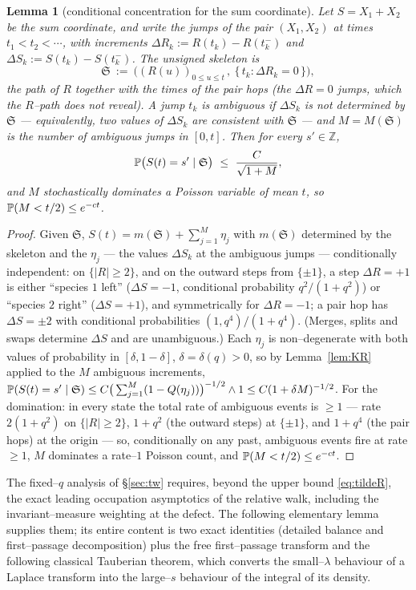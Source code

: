 \documentclass[11pt]{article}
\theoremstyle{plain}
\newtheorem{lemma}[theorem]{Lemma}
\theoremstyle{definition}
\theoremstyle{remark}
\newcommand{\Z}{\mathbb{Z}}\newcommand{\R}{\mathbb{R}}\newcommand{\N}{\mathbb{N}}
\begin{document}
\begin{lemma}[conditional concentration for the sum coordinate]\label{lem:Slclt}
Let $S=X_1+X_2$ be the sum coordinate, and write the jumps of the pair $(X_1,X_2)$ at
times $t_1<t_2<\cdots$, with increments $\Delta R_k:=R(t_k)-R(t_k^-)$ and
$\Delta S_k:=S(t_k)-S(t_k^-)$. The \emph{unsigned skeleton} is
\begin{equation}\label{eq:skeleton}
  \mathfrak S\ :=\ \Big((R(u))_{0\le u\le t}\,,\ \{\,t_k:\Delta R_k=0\,\}\Big),
\end{equation}
the path of $R$ together with the times of the pair hops (the $\Delta R=0$ jumps, which
the $R$--path does not reveal). A jump $t_k$ is \emph{ambiguous} if $\Delta S_k$ is not
determined by $\mathfrak S$ --- equivalently, two values of $\Delta S_k$ are consistent
with $\mathfrak S$ --- and $M=M(\mathfrak S)$ is the number of ambiguous jumps in
$[0,t]$. Then for every $s'\in\Z$,
\[
  \PP\big(S(t)=s'\mid \mathfrak S\big)\ \le\ \frac{C}{\sqrt{1+M}},
\]
and $M$ stochastically dominates a Poisson variable of mean $t$, so
$\mathbb{P}(M<t/2)\le e^{-ct}$.
\end{lemma}
\begin{proof}
Given $\mathfrak S$, $S(t)=m(\mathfrak S)+\sum_{j=1}^M\eta_j$ with $m(\mathfrak S)$
determined by the skeleton and the $\eta_j$ --- the values $\Delta S_k$ at the
ambiguous jumps --- conditionally independent: on
$\{|R|\ge2\}$, and on the outward steps from $\{\pm1\}$, a step $\Delta R=+1$ is
either ``species $1$ left'' ($\Delta S=-1$, conditional probability $q^2/(1+q^2)$) or
``species $2$ right'' ($\Delta S=+1$), and symmetrically for $\Delta R=-1$; a pair
hop has $\Delta S=\pm2$ with conditional probabilities $(1,q^4)/(1+q^4)$. (Merges,
splits and swaps determine $\Delta S$ and are unambiguous.) Each $\eta_j$ is
non--degenerate with both values of probability in $[\delta,1-\delta]$,
$\delta=\delta(q)>0$, so by Lemma~\ref{lem:KR} applied to the $M$ ambiguous increments,
$\mathbb{P}(S(t)=s'\mid\mathfrak S)\le C\big(\sum_{j=1}^M(1-Q(\eta_j))\big)^{-1/2}\wedge1
\le C(1+\delta M)^{-1/2}$. For the domination: in every state the total rate of
ambiguous events is $\ge1$ --- rate $2(1+q^2)$ on $\{|R|\ge2\}$, $1+q^2$ (the outward
steps) at $\{\pm1\}$, and $1+q^4$ (the pair hops) at the origin --- so, conditionally
on any past, ambiguous events fire at rate $\ge1$, $M$ dominates a rate--$1$ Poisson
count, and $\mathbb{P}(M<t/2)\le e^{-ct}$.
\end{proof}

The fixed--$q$ analysis of \S\ref{sec:tw} requires, beyond the upper bound
\eqref{eq:tildeR}, the exact leading occupation asymptotics of the relative walk,
including the invariant--measure weighting at the defect. The following elementary
lemma supplies them; its entire content is two exact identities (detailed balance and
first--passage decomposition) plus the free first--passage transform and the following
classical Tauberian theorem, which converts the small--$\lambda$ behaviour of a Laplace
transform into the large--$s$ behaviour of the integral of its density.
\end{document}
